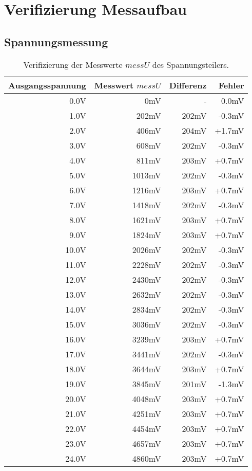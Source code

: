 \section{Verifizierung Messaufbau}

\subsection{Spannungsmessung}\label{subsec_messu}

\begin{table}[h]
\centering
\begin{tabular}{|r|r|r|r|}
	\hline
	\textbf{Ausgangsspannung} & \textbf{Messwert $messU$} & \textbf{Differenz} & \textbf{Fehler} \\ \hline
	0.0V & 0mV & - & 0.0mV \\ \hline
	1.0V & 202mV & 202mV & -0.3mV \\ \hline
	2.0V & 406mV & 204mV & +1.7mV \\ \hline
	3.0V & 608mV & 202mV & -0.3mV \\ \hline
	4.0V & 811mV & 203mV & +0.7mV \\ \hline
	5.0V & 1013mV & 202mV & -0.3mV \\ \hline
	6.0V & 1216mV & 203mV & +0.7mV \\ \hline
	7.0V & 1418mV & 202mV & -0.3mV \\ \hline
	8.0V & 1621mV & 203mV & +0.7mV \\ \hline
	9.0V & 1824mV & 203mV & +0.7mV \\ \hline
	10.0V & 2026mV & 202mV & -0.3mV \\ \hline
	11.0V & 2228mV & 202mV & -0.3mV \\ \hline
	12.0V & 2430mV & 202mV & -0.3mV \\ \hline
	13.0V & 2632mV & 202mV & -0.3mV \\ \hline
	14.0V & 2834mV & 202mV & -0.3mV \\ \hline
	15.0V & 3036mV & 202mV & -0.3mV \\ \hline
	16.0V & 3239mV & 203mV & +0.7mV \\ \hline
	17.0V & 3441mV & 202mV & -0.3mV \\ \hline
	18.0V & 3644mV & 203mV & +0.7mV \\ \hline
	19.0V & 3845mV & 201mV & -1.3mV \\ \hline
	20.0V & 4048mV & 203mV & +0.7mV \\ \hline
	21.0V & 4251mV & 203mV & +0.7mV \\ \hline
	22.0V & 4454mV & 203mV & +0.7mV \\ \hline
	23.0V & 4657mV & 203mV & +0.7mV \\ \hline
	24.0V & 4860mV & 203mV & +0.7mV \\ \hline
\end{tabular}
\caption{Verifizierung der Messwerte $messU$ des Spannungsteilers.}
\label{tab:messU}
\end{table}

